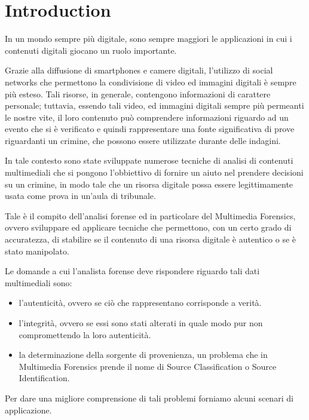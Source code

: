 \chapter*{Introduction}

In un mondo sempre più digitale, sono sempre maggiori le applicazioni in cui i contenuti digitali giocano un ruolo importante.

Grazie alla diffusione di smartphones e camere digitali, l'utilizzo di social networks che permettono la condivisione di video ed immagini digitali è sempre più esteso. Tali risorse, in generale, contengono informazioni di carattere personale; tuttavia, essendo tali video, ed immagini digitali sempre più permeanti le nostre vite, il loro contenuto può comprendere informazioni riguardo ad un evento che si è verificato e quindi rappresentare una fonte significativa di prove riguardanti un crimine, che possono essere utilizzate durante delle indagini. 

In tale contesto sono state sviluppate numerose tecniche di analisi di contenuti multimediali che si pongono l'obbiettivo di fornire un aiuto nel prendere decisioni su un crimine, in modo tale che un risorsa digitale possa essere legittimamente usata come prova in un'aula di tribunale.

Tale è il compito dell'analisi forense ed in particolare del Multimedia Forensics, ovvero sviluppare ed applicare tecniche che permettono, con un certo grado di accuratezza, di stabilire se il contenuto di una risorsa digitale è autentico o se è stato manipolato.

Le domande a cui l'analista forense deve rispondere riguardo tali dati multimediali sono:
\begin{itemize}
\item l'autenticità, ovvero se ciò che rappresentano corrisponde a verità.
\item l'integrità, ovvero se essi sono stati alterati in quale modo pur non compromettendo la loro autenticità.
\item la determinazione della sorgente di provenienza, un problema che in Multimedia Forensics prende il nome di Source Classification o Source Identification.
\end{itemize}

Per dare una migliore comprensione di tali problemi forniamo alcuni scenari di applicazione.

